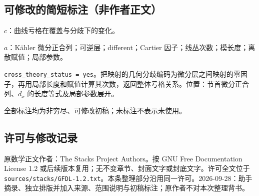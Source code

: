 \documentclass[UTF8,11pt]{ctexart}
\theoremstyle{definition}
\begin{document}
\subsection*{可修改的简短标注（非作者正文）}
$c$：曲线亏格在覆盖与分歧下的变化。

$a$：Kähler 微分正合列；可逆层；different；Cartier 因子；线丛次数；模长度；离散赋值；局部参数。

\texttt{cross\_theory\_status = yes}。把映射的几何分歧编码为微分层之间映射的零因子，再用局部长度和赋值计算其次数，返回整体亏格关系。位置：节首微分正合列、$d_x$ 的长度等式及局部参数展开。

全部标注均为非穷尽、可修改初稿；未标注不表示未使用。
\subsection*{许可与修改记录}
原数学正文作者：The Stacks Project Authors。按 GNU Free Documentation License 1.2 或后续版本复用；无不变章节、封面文字或封底文字。许可全文位于 \texttt{sources/stacks/GFDL-1.2.txt}。本条整理部分沿用同一许可。2026-09-28：助手摘录、独立排版并加入来源、范围说明与初稿标注；原作者不对本次整理背书。
\end{document}
